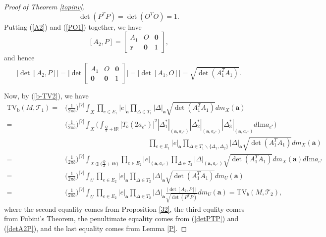 \documentclass[11pt]{article}
\renewcommand{\setminus}{{\smallsetminus}}
\theoremstyle{remark}
\theoremstyle{remark}
\numberwithin{equation}{section}
\begin{document}
\begin{proof}[Proof of Theorem \ref{topinv}]
\begin{equation}
\det(P^TP)=\det (O^TO)=1.
\end{equation}
Putting (\ref{A2}) and (\ref{PO1}) together, we have 
$$[A_2,P] = \left[\begin{matrix}
    A_1 & O & \boldsymbol 0\\
    \boldsymbol r & \boldsymbol 0 & 1
\end{matrix}  \right],$$
and hence 
\begin{equation}\label{detA2P}
    \big|\det [A_2,P]\big|= \Bigg|\det \left[\begin{matrix}
    A_1 & O & \boldsymbol 0\\
    \boldsymbol 0 & \boldsymbol 0 & 1
\end{matrix}  \right]\Bigg|=\big|\det [A_1, O]\big|=\sqrt{\det(A_1^TA_1)}.
\end{equation}

Now, by (\ref{b-TV2}), we have 
 \begin{equation*}
  \begin{split}
    \mathrm{TV_b}(M,\mathcal T_1)=& \Big(\frac{1}{2\pi b}\Big)^{|V|} \int _ X \prod_{e\in E_1} |e|_{\boldsymbol{a}}\prod_{\Delta\in T_1}|\Delta|_{\boldsymbol a}\sqrt{\det(A_1^T A_1)}dm_X(\boldsymbol a)\\
=& \Big(\frac{1}{2\pi b}\Big)^{|V|}  \int _ X \bigg(\int_{\frac{Q}{2}+\mathbf i\mathbb R}|T_b(2a_{e^*})|^2|\Delta_1^*|_{(\boldsymbol a,a_{e^*})}|\Delta_2^*|_{(\boldsymbol a,a_{e^*})}|\Delta_3^*|_{(\boldsymbol a,a_{e^*})}d\mathrm{Im}a_{e^*}\bigg)\\
&\quad\quad\quad\quad\quad\quad\quad\quad\quad\quad\quad\quad \prod_{e\in E_1} |e|_{\boldsymbol{a}}\prod_{\Delta\in T_1\setminus \{\Delta_1,\Delta_2\}}|\Delta|_{\boldsymbol a}\sqrt{\det(A_1^T A_1)}dm_X(\boldsymbol a)\\
=& \Big(\frac{1}{2\pi b}\Big)^{|V|}  \int _ {X\oplus \big(\frac{Q}{2}+\mathbf i\mathbb R\big)} \prod_{e\in E_2} |e|_{(\boldsymbol{a},a_{e^*})}\prod_{\Delta\in T_2}|\Delta|_{(\boldsymbol a,a_{e^*})}\sqrt{\det(A_1^T A_1)}dm_X(\boldsymbol a)d\mathrm{Im}a_{e^*}\\
=& \Big(\frac{1}{2\pi b}\Big)^{|V|}  \int _ U \prod_{e\in E_2} |e|_{\boldsymbol{a}}\prod_{\Delta\in T_2}|\Delta|_{\boldsymbol a}\sqrt{\det(A_1^T A_1)}dm_U(\boldsymbol a)\\
=& \Big(\frac{1}{2\pi b}\Big)^{|V|}  \int _ U \prod_{e\in E_2} |e|_{\boldsymbol{a}}\prod_{\Delta\in T_2}|\Delta|_{\boldsymbol a}\frac{\big|\det[A_2,P]\big|}{\sqrt{\det(P^T P)}}dm_U(\boldsymbol a) = \mathrm{TV}_b(M,\mathcal T_2),
\end{split}   
 \end{equation*}
where the second equality comes from Proposition \ref{32}, the third equlity comes from Fubini's Theorem, the penultimate equality comes from (\ref{detPTP}) and (\ref{detA2P}), and the last equality comes from Lemma \ref{P}.
\end{proof}
\end{document}
